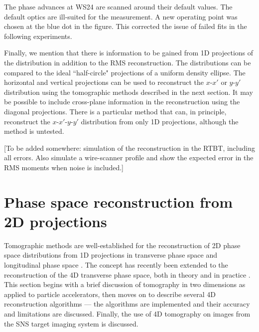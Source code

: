 %
The phase advances at WS24 are scanned around their default values. The default optics are ill-suited for the measurement. A new operating point was chosen at the blue dot in the figure. This corrected the issue of failed fits in the following experiments. 

Finally, we mention that there is information to be gained from 1D projections of the distribution in addition to the RMS reconstruction. The distributions can be compared to the ideal ``half-circle" projections of a uniform density ellipse. The horizontal and vertical projections can be used to reconstruct the $x$-$x'$ or $y$-$y'$ distribution using the tomographic methods described in the next section. It may be possible to include cross-plane information in the reconstruction using the diagonal projections. There is a particular method that can, in principle, reconstruct the $x$-$x'$-$y$-$y'$ distribution from only 1D projections, although the method is untested. 

[To be added somewhere: simulation of the reconstruction in the RTBT, including all errors. Also simulate a wire-scanner profile and show the expected error in the RMS moments when noise is included.]








\section{Phase space reconstruction from 2D projections}

Tomographic methods are well-established for the reconstruction of 2D phase space distributions from 1D projections in transverse phase space \cite{Hock2014} and longitudinal phase space \cite{Evans2014}. The concept has recently been extended to the reconstruction of the 4D transverse phase space, both in theory and in practice \cite{Hock2013b, Wang2019, Wolski2020}. This section begins with a brief discussion of tomography in two dimensions as applied to particle accelerators, then moves on to describe several 4D reconstruction algorithms — the algorithms are implemented and their accuracy and limitations are discussed. Finally, the use of 4D tomography on images from the SNS target imaging system is discussed.



